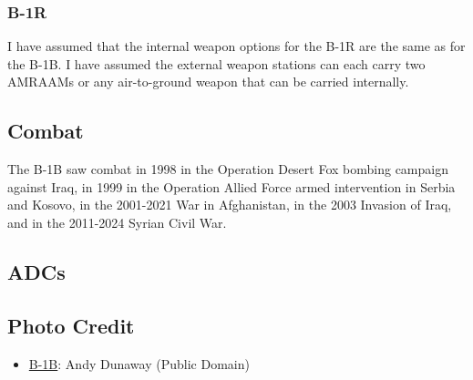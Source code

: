 \subsubsection{B-1R}

I have assumed that the internal weapon options for the B-1R are the same as for the B-1B. I have assumed the external weapon stations can each carry two AMRAAMs or any air-to-ground weapon that can be carried internally.

\subsection{Combat}

The B-1B saw combat in 1998 in the Operation Desert Fox bombing campaign against Iraq, in 1999 in the Operation Allied Force armed intervention in Serbia and Kosovo, in the 2001-2021 War in Afghanistan, in the 2003 Invasion of Iraq, and in the 2011-2024 Syrian Civil War.

\subsection{ADCs}
\begin{adclist}
\end{adclist}

\subsection{Photo Credit}
\begin{itemize}\raggedright
    \item \href{https://commons.wikimedia.org/wiki/File:B-1B.jpg}{B-1B}: Andy Dunaway (Public Domain)
\end{itemize}
